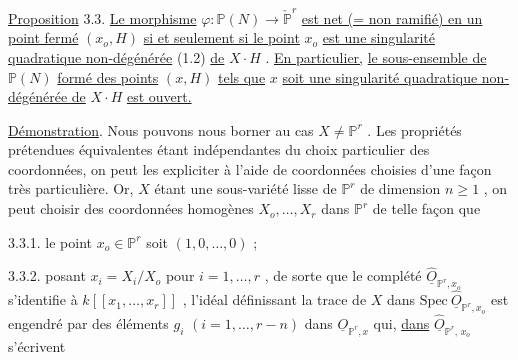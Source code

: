 \begin{center}
\end{center}
\underline{Proposition} 3.3. \underline{Le morphisme} $\varphi : \mathbb{P}(N) \longrightarrow \check{\mathbb{P}}^{r}$ \underline{est net (= non ramifié) en un point fermé} $(x_{o}, H)$ \underline{si et seulement si le point} $x_{o}$ \underline{est une singularité quadratique non-dégénérée} (1.2) \underline{de} $X \cdot H$ . \underline{En particulier,} \underline{le sous-ensemble de} $\mathbb{P}(N)$ \underline{formé des points} $(x, H)$ \underline{tels que} $x$ \underline{soit une singularité quadratique non-dégénérée de} $X \cdot H$ \underline{est ouvert.}



\underline{Démonstration}. Nous pouvons nous borner au cas $X \neq \mathbb{P}^r$ . Les propriétés prétendues équivalentes étant indépendantes du choix particulier des coordonnées, on peut les expliciter à l'aide de  coordonnées choisies d'une façon très particulière. Or, $X$ étant une sous-variété lisse de $\mathbb{P}^r$ de dimension $n \geq 1$ , on peut choisir des coordonnées homogènes $X_o,\dots,X_r$ dans $\mathbb{P}^r$ de telle façon que

3.3.1.  le point $x_o \in \mathbb{P}^r$ soit $(1, 0,\dots,0)$ ;

3.3.2.  posant $x_i = X_i/X_o$ pour $i = 1,\dots,r$ , de sorte que le complété $\hat{\underline{O}}_{\mathbb{P}^r,x_o}$ s'identifie à $k[[x_1,\dots,x_r]]$ , l'idéal définissant la trace de $X$ dans $\mathrm{Spec}\ \hat{\underline{O}}_{\mathbb{P}^r,x_o}$ est engendré par des éléments $g_i$ $(i=1,\dots,r-n)$ dans $\underline{O}_{\mathbb{P}^r,x}$ qui, \underline{dans} $\hat{\underline{O}}_{\mathbb{P}^r,\, x_o}$ s'écrivent

